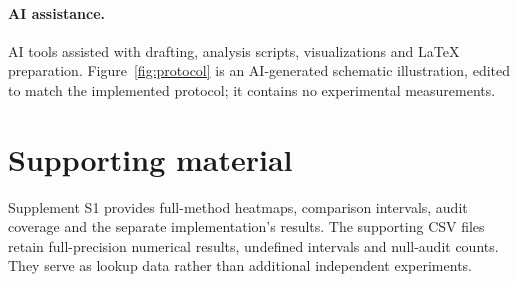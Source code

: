 \documentclass[pdflatex,iicol,sn-mathphys-num]{sn-jnl}
\begin{document}
\paragraph{AI assistance.} AI tools assisted with drafting, analysis scripts, visualizations and LaTeX preparation. Figure~\ref{fig:protocol} is an AI-generated schematic illustration, edited to match the implemented protocol; it contains no experimental measurements.

\section*{Supporting material}
Supplement S1 provides full-method heatmaps, comparison intervals, audit coverage and the separate implementation's results. The supporting CSV files retain full-precision numerical results, undefined intervals and null-audit counts. They serve as lookup data rather than additional independent experiments.

\end{document}
